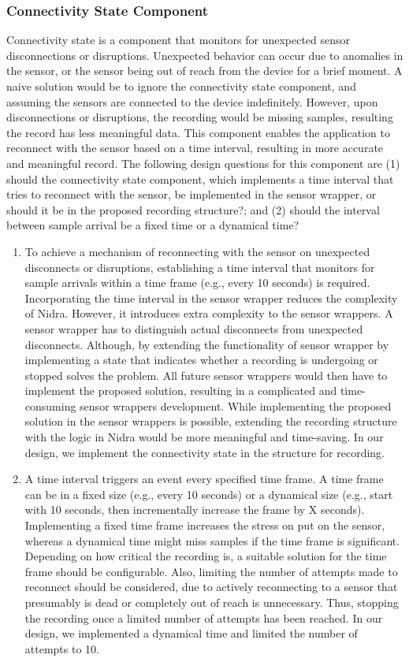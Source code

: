 \subsubsection{Connectivity State Component} \label{sssec:csc}
Connectivity state is a component that monitors for unexpected sensor disconnections or disruptions. Unexpected behavior can occur due to anomalies in the sensor, or the sensor being out of reach from the device for a brief moment.  A naive solution would be to ignore the connectivity state component, and assuming the sensors are connected to the device indefinitely. However, upon disconnections or disruptions, the recording would be missing samples, resulting the record has less meaningful data. This component enables the application to reconnect with the sensor based on a time interval, resulting in more accurate and meaningful record. The following design questions for this component are (1) should the connectivity state component, which implements a time interval that tries to reconnect with the sensor, be implemented in the sensor wrapper, or should it be in the proposed recording structure?; and (2) should the interval between sample arrival be a fixed time or a dynamical time? 


\begin{enumerate}
    \item To achieve a mechanism of reconnecting with the sensor on unexpected disconnects or disruptions, establishing a time interval that monitors for sample arrivals within a time frame (e.g., every 10 seconds) is required. Incorporating the time interval in the sensor wrapper reduces the complexity of Nidra. However, it introduces extra complexity to the sensor wrappers. A sensor wrapper has to distinguish actual disconnects from unexpected disconnects. Although, by extending the functionality of sensor wrapper by implementing a state that indicates whether a recording is undergoing or stopped solves the problem. All future sensor wrappers would then have to implement the proposed solution, resulting in a complicated and time-consuming sensor wrappers development. While implementing the proposed solution in the sensor wrappers is possible, extending the recording structure with the logic in Nidra would be more meaningful and time-saving. In our design, we implement the connectivity state in the structure for recording.
    \item A time interval triggers an event every specified time frame. A time frame can be in a fixed size (e.g., every 10 seconds) or a dynamical size (e.g., start with 10 seconds, then incrementally increase the frame by X seconds). Implementing a fixed time frame increases the stress on put on the sensor, whereas a dynamical time might miss samples if the time frame is significant. Depending on how critical the recording is, a suitable solution for the time frame should be configurable. Also, limiting the number of attempts made to reconnect should be considered, due to actively reconnecting to a sensor that presumably is dead or completely out of reach is unnecessary. Thus, stopping the recording once a limited number of attempts has been reached.  In our design, we implemented a dynamical time and limited the number of attempts to 10. 
\end{enumerate}

